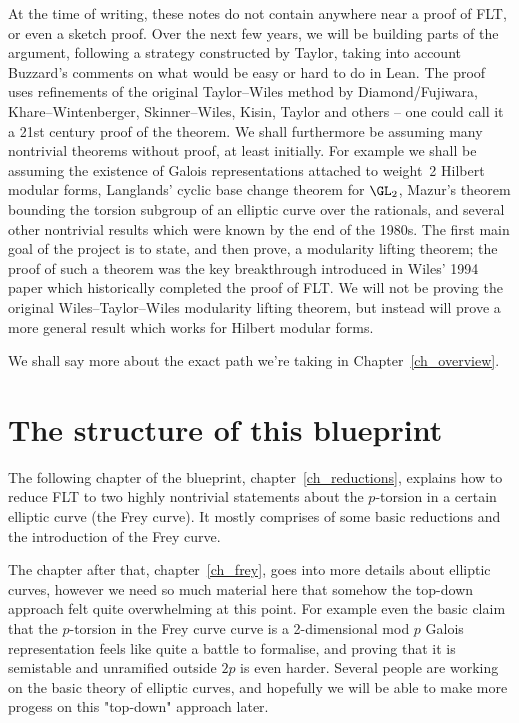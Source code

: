 At the time of writing, these notes do not contain anywhere near a proof of FLT, or even a sketch proof.
Over the next few years, we will be building parts of the argument, following a strategy
constructed by Taylor, taking into account Buzzard's comments on what would be easy or hard to do
in Lean. The proof uses refinements of the original Taylor--Wiles method by Diamond/Fujiwara,
Khare--Wintenberger, Skinner--Wiles, Kisin, Taylor and others -- one could call it a 21st century
proof of the theorem. We shall furthermore be assuming many nontrivial theorems without proof,
at least initially. For example we shall be assuming the existence of Galois representations
attached to weight~2 Hilbert modular forms, Langlands' cyclic base change theorem for $\GL_2$,
Mazur's theorem bounding the torsion subgroup of an elliptic curve over the rationals, and
several other nontrivial results which were known by the end of the 1980s. The first main goal
of the project is to state, and then prove, a modularity lifting theorem; the proof of such a theorem
was the key breakthrough introduced in Wiles' 1994 paper which historically completed the proof
of FLT. We will not be proving the original Wiles--Taylor--Wiles modularity lifting theorem, but
instead will prove a more general result which works for Hilbert modular forms.

We shall say more about the exact path we're taking in
Chapter~\ref{ch_overview}.

\section{The structure of this blueprint}

The following chapter of the blueprint, chapter~\ref{ch_reductions}, explains how to reduce FLT
to two highly nontrivial statements about the $p$-torsion in a certain elliptic curve (the Frey curve).
It mostly comprises of some basic reductions and the introduction of the Frey curve.

The chapter after that, chapter~\ref{ch_frey}, goes into more details about elliptic curves,
however we need so much material here that somehow the top-down approach felt quite overwhelming
at this point. For example even the basic claim that the $p$-torsion in the Frey curve curve is
a 2-dimensional mod $p$ Galois representation feels like quite a battle to formalise,
and proving that it is semistable and unramified outside $2p$ is even harder.
Several people are working on the basic theory of elliptic curves, and hopefully
we will be able to make more progess on this "top-down" approach later.

